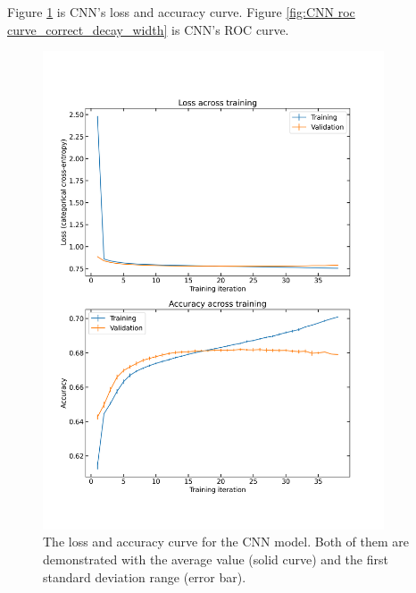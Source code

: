 \documentclass[12pt]{article}
\begin{document}
		Figure \ref{fig:CNN learning curve_correct_decay_width} is CNN's loss and accuracy curve. Figure \ref{fig:CNN roc curve_correct_decay_width} is CNN's ROC curve.
		\begin{figure}[htpb]
			\centering
			\includegraphics[width=0.90\textwidth]{CNN_loss_and_accuracy_correct_width.png}
			\caption{The loss and accuracy curve for the CNN model. Both of them are demonstrated with the average value (solid curve) and the first standard deviation range (error bar).}
			\label{fig:CNN learning curve_correct_decay_width}
		\end{figure}
\end{document}
